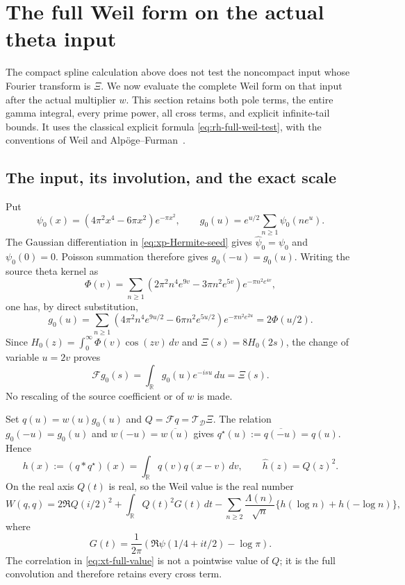 \section{The full Weil form on the actual theta input}
\label{sec:xi4-actual-theta-weil}

The compact spline calculation above does not test the noncompact input
whose Fourier transform is \(\Xi\). We now evaluate the complete Weil form
on that input after the actual multiplier \(w\). This section retains both
pole terms, the entire gamma integral, every prime power, all cross terms,
and explicit infinite-tail bounds. It uses the classical explicit formula
\eqref{eq:rh-full-weil-test}, with the conventions of Weil
\cite{weil1952} and Alp\"oge--Furman~\cite[Sections 1.1--1.2 and 2]{alpogeFurman2026}.

\subsection{The input, its involution, and the exact scale}

Put
\[
 \psi_0(x)=(4\pi^2x^4-6\pi x^2)e^{-\pi x^2},\qquad
 g_0(u)=e^{u/2}\sum_{n\ge1}\psi_0(ne^u).
\]
The Gaussian differentiation in \eqref{eq:xp-Hermite-seed} gives
\(\widehat\psi_0=\psi_0\) and \(\psi_0(0)=0\). Poisson summation therefore
gives \(g_0(-u)=g_0(u)\). Writing the source theta kernel as
\[
 \Phi(v)=\sum_{n\ge1}
 (2\pi^2n^4e^{9v}-3\pi n^2e^{5v})e^{-\pi n^2e^{4v}},
\]
one has, by direct substitution,
\begin{equation}\label{eq:xt-g0-scale}
 g_0(u)=\sum_{n\ge1}(4\pi^2n^4e^{9u/2}-6\pi n^2e^{5u/2})e^{-\pi n^2e^{2u}}
       =2\Phi(u/2).
\end{equation}
Since \(H_0(z)=\int_0^\infty\Phi(v)\cos(zv)\,dv\) and
\(\Xi(s)=8H_0(2s)\), the change of variable \(u=2v\) proves
\[
 \mathscr Fg_0(s)=\int_{\mathbb R}g_0(u)e^{-isu}\,du=\Xi(s).
\]
No rescaling of the source coefficient or of \(w\) is made.

Set \(q(u)=w(u)g_0(u)\) and \(Q=\mathscr Fq=\mathcal T_{\mathcal D}\Xi\).
The relation \(g_0(-u)=g_0(u)\) and \(w(-u)=\overline{w(u)}\) gives
\(q^\star(u):=\overline{q(-u)}=q(u)\). Hence
\[
 h(x):=(q*q^\star)(x)=\int_{\mathbb R}q(v)q(x-v)\,dv,
 \qquad \widehat h(z)=Q(z)^2.
\]
On the real axis \(Q(t)\) is real, so the Weil value is the real number
\begin{equation}\label{eq:xt-full-value}
 W(q,q)=2\Re Q(i/2)^2+\int_{\mathbb R}Q(t)^2G(t)\,dt
 -\sum_{n\ge2}\frac{\Lambda(n)}{\sqrt n}
       \{h(\log n)+h(-\log n)\},
\end{equation}
where
\[
 G(t)=\frac{1}{2\pi}\left(\Re\psi(1/4+it/2)-\log\pi\right).
\]
The correlation in \eqref{eq:xt-full-value} is not a pointwise value of
\(Q\); it is the full convolution and therefore retains every cross term.

